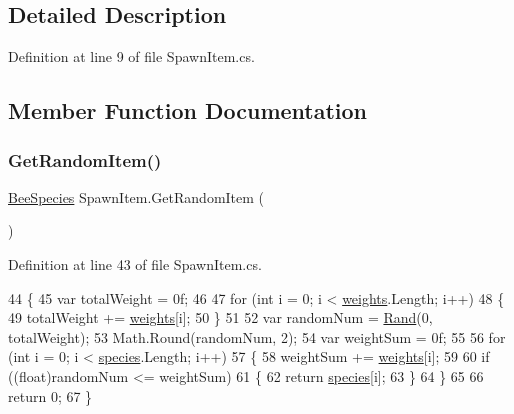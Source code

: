 \subsection{Detailed Description}


Definition at line 9 of file Spawn\+Item.\+cs.



\subsection{Member Function Documentation}
\mbox{\label{class_spawn_item_af8aa1bfe3ed53c05d673dd46b26bc97e}} 
\subsubsection{\texorpdfstring{Get\+Random\+Item()}{GetRandomItem()}}
{\footnotesize\ttfamily \hyperlink{namespace_bee_game_1_1_enums_aa2ead984825678d83c42d48f6382619c}{Bee\+Species} Spawn\+Item.\+Get\+Random\+Item (\begin{DoxyParamCaption}{ }\end{DoxyParamCaption})\hspace{0.3cm}{\ttfamily [private]}}



Definition at line 43 of file Spawn\+Item.\+cs.


\begin{DoxyCode}
44     \{
45         var totalWeight = 0f;
46 
47         \textcolor{keywordflow}{for} (\textcolor{keywordtype}{int} i = 0; i < \hyperlink{class_spawn_item_a52966f3825c8c50f79c0a9a1ba300b52}{weights}.Length; i++)
48         \{
49             totalWeight += \hyperlink{class_spawn_item_a52966f3825c8c50f79c0a9a1ba300b52}{weights}[i];
50         \}
51 
52         var randomNum = \hyperlink{class_spawn_item_ac77536d30b5e96d90b03ea4b4ee5c2a8}{Rand}(0, totalWeight);
53         Math.Round(randomNum, 2);
54         var weightSum = 0f;
55 
56         \textcolor{keywordflow}{for} (\textcolor{keywordtype}{int} i = 0; i < \hyperlink{class_spawn_item_a0af51e744d43adcc6a295222b5d70a6e}{species}.Length; i++)
57         \{
58             weightSum += \hyperlink{class_spawn_item_a52966f3825c8c50f79c0a9a1ba300b52}{weights}[i];
59 
60             \textcolor{keywordflow}{if} ((\textcolor{keywordtype}{float})randomNum <= weightSum)
61             \{
62                 \textcolor{keywordflow}{return} \hyperlink{class_spawn_item_a0af51e744d43adcc6a295222b5d70a6e}{species}[i];
63             \}
64         \}
65 
66         \textcolor{keywordflow}{return} 0;
67     \}
\end{DoxyCode}
\mbox{\label{class_spawn_item_ac77536d30b5e96d90b03ea4b4ee5c2a8}} 
